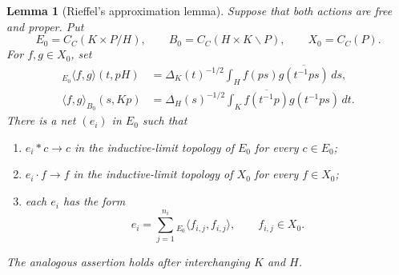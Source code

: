 \documentclass{book}
\newtheorem{lemma}[definition]{Lemma}
\begin{document}
\begin{lemma}[Rieffel's approximation lemma]
  \label{lem:RieffelApproximation}
  Suppose that both actions are free and proper. Put
  \[
    E_0=C_C(K\times P/H),\qquad
    B_0=C_C(H\times K\backslash P),\qquad
    X_0=C_C(P).
  \]
  For \(f,g\in X_0\), set
  \begin{align}
    {}_{E_0}\!\langle f,g\rangle(t,pH)
      &=\Delta_K(t)^{-1/2}
        \int_H f(ps)\overline{g(t^{-1}ps)}\,ds,
      \label{eq:RieffelGeneralLeftInner}\\
    \langle f,g\rangle_{B_0}(s,Kp)
      &=\Delta_H(s)^{-1/2}
        \int_K\overline{f(t^{-1}p)}g(t^{-1}ps)\,dt.
      \label{eq:RieffelGeneralRightInner}
  \end{align}
  There is a net \((e_i)\) in \(E_0\) such that
  \begin{enumerate}
    \item \(e_i*c\to c\) in the inductive-limit topology of \(E_0\) for
      every \(c\in E_0\);
    \item \(e_i\cdot f\to f\) in the inductive-limit topology of \(X_0\)
      for every \(f\in X_0\);
    \item each \(e_i\) has the form
      \[
        e_i=\sum_{j=1}^{n_i}{}_{E_0}\!\langle f_{i,j},f_{i,j}\rangle,
        \qquad f_{i,j}\in X_0.
      \]
  \end{enumerate}
  The analogous assertion holds after interchanging \(K\) and \(H\).
\end{lemma}
\end{document}

